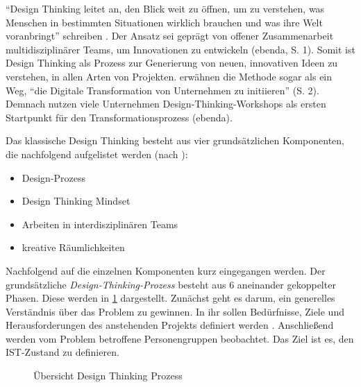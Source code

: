 ``Design Thinking leitet an, den Blick weit zu öffnen, um zu verstehen, was Menschen in bestimmten Situationen wirklich brauchen und was ihre Welt voranbringt''  schreiben . Der Ansatz sei geprägt von offener Zusammenarbeit multidisziplinärer Teams, um Innovationen zu entwickeln (ebenda, S. 1).  Somit ist Design Thinking als Prozess zur Generierung von neuen, innovativen Ideen zu verstehen, in allen Arten von Projekten.  erwähnen die Methode sogar als ein Weg, ``die Digitale Transformation von Unternehmen zu initiieren'' (S. 2). Demnach nutzen viele Unternehmen Design-Thinking-Workshops als ersten Startpunkt für den Transformationsprozess (ebenda).

Das klassische Design Thinking besteht aus vier grundsätzlichen Komponenten, die nachfolgend aufgelistet werden (nach ):

\begin{itemize}[noitemsep, topsep=0pt]
	\item Design-Prozess
	\item Design Thinking Mindset
	\item Arbeiten in interdisziplinären Teams
	\item kreative Räumlichkeiten
\end{itemize}

Nachfolgend auf die einzelnen Komponenten kurz eingegangen werden. Der grundsätzliche \textit{Design-Thinking-Prozess} besteht aus 6 aneinander gekoppelter Phasen. Diese werden in \ref{fig:designthinking} dargestellt. Zunächst geht es darum, ein generelles Verständnis über das Problem zu gewinnen. In ihr sollen Bedürfnisse, Ziele und Herausforderungen des anstehenden Projekts definiert werden \cite[S. 2]{lewrick_design_2018}. Anschließend werden vom Problem betroffene Personengruppen beobachtet. Das Ziel ist es, den IST-Zustand zu definieren.

\begin{figure}[H]
	\centering
	\caption[Übersicht Design Thinking Prozess]{Übersicht Design Thinking Prozess \protect \footnotemark}
	\label{fig:designthinking}
\end{figure}

